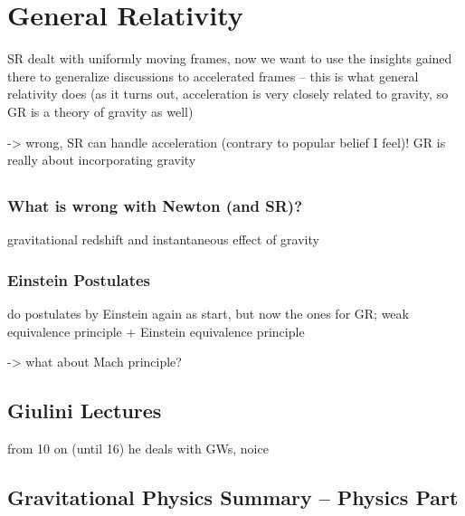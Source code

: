 




\chapter{General Relativity}

SR dealt with uniformly moving frames, now we want to use the insights gained there to generalize discussions to accelerated frames -- this is what general relativity does (as it turns out, acceleration is very closely related to gravity, so GR is a theory of gravity as well)

-> wrong, SR can handle acceleration (contrary to popular belief I feel)! GR is really about incorporating gravity




	\section{}
		\subsection{What is wrong with Newton (and SR)?}
gravitational redshift and instantaneous effect of gravity



		\subsection{Einstein Postulates}
do postulates by Einstein again as start, but now the ones for GR; weak equivalence principle + Einstein equivalence principle

-> what about Mach principle?



\newpage



	\section{Giulini Lectures}
from 10 on (until 16) he deals with GWs, noice



\newpage



	\section{Gravitational Physics Summary -- Physics Part}

